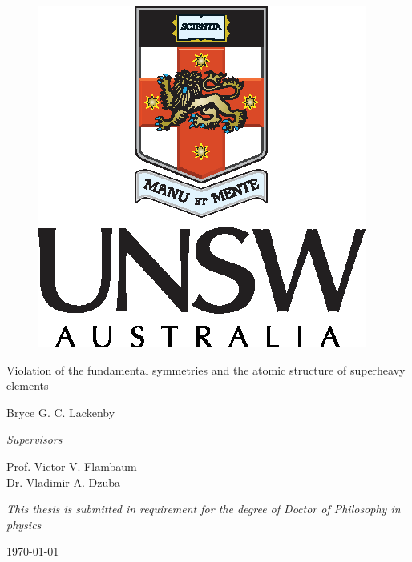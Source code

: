 \documentclass[10pt,a4paper, twoside, openright]{report}
\begin{document}
\begin{titlepage}
	\vspace{10cm}
	\centering
	\begin{figure}
\centering
\includegraphics[scale=1]{./figures/unsw-crest.eps}
\captionsetup[figure]{list=no}
\end{figure}
    \captionsetup[figure]{list=no}
	\vspace{3cm}
	\vfill
	{\huge Violation of the fundamental symmetries and the atomic structure of superheavy elements\par}
	\vspace{2cm}
	{\Large Bryce G. C. Lackenby \par}
	\vfill
	{\normalsize \textit{Supervisors}\par}
	{\large Prof. Victor V. Flambaum} \\
	{\large Dr. Vladimir A. Dzuba} \\
	\centering

	\vfill

{\footnotesize \textit{This thesis is submitted in requirement for the degree of Doctor of Philosophy in physics}} \\
	{\large \today\par}
\end{titlepage}
\onehalfspacing

\tableofcontents
\end{document}
